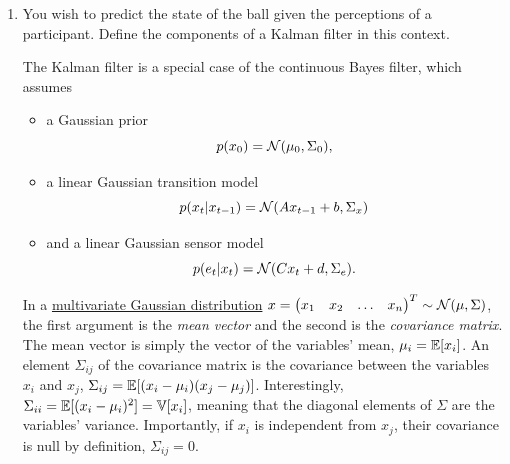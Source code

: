 \documentclass[11pt, a4paper]{article}
\begin{document}
\begin{enumerate}
    \item You wish to predict the state of the ball given the perceptions of a participant. Define the components of a Kalman filter in this context.

    \begin{solution}
        The Kalman filter is a special case of the continuous Bayes filter, which assumes
        \begin{itemize}
            \item a Gaussian prior
            \begin{equation*}
                p(x_0) = \mathcal{N}(\mu_0, \Sigma_0),
            \end{equation*}
            \item a linear Gaussian transition model
            \begin{equation*}
                p(x_t \vert x_{t - 1}) = \mathcal{N}(A x_{t - 1} + b, \Sigma_x)
            \end{equation*}
            \item and a linear Gaussian sensor model
            \begin{equation*}
                p(e_t \vert x_t) = \mathcal{N}(C x_t + d, \Sigma_e).
            \end{equation*}
        \end{itemize}
        In a \href{https://en.wikipedia.org/wiki/Multivariate_normal_distribution}{multivariate Gaussian distribution} $x = \begin{pmatrix}x_1 & x_2 & \dots & x_n\end{pmatrix}^T \sim \mathcal{N}(\mu, \Sigma)$, the first argument is the \emph{mean vector} and the second is the \emph{covariance matrix}. The mean vector is simply the vector of the variables' mean, \ie{} $\mu_i = \mathbb{E}[x_i]$. An element $\Sigma_{ij}$ of the covariance matrix is the covariance between the variables $x_i$ and $x_j$, \ie{} $\Sigma_{ij} = \mathbb{E}[(x_i - \mu_i) (x_j - \mu_j)]$. Interestingly, $\Sigma_{ii} = \mathbb{E}[(x_i - \mu_i)^2] = \mathbb{V}[x_i]$, meaning that the diagonal elements of $\Sigma$ are the variables' variance. Importantly, if $x_i$ is independent from $x_j$, their covariance is null by definition, \ie{} $\Sigma_{ij} = 0$.


\end{solution}
\end{enumerate}
\end{document}

